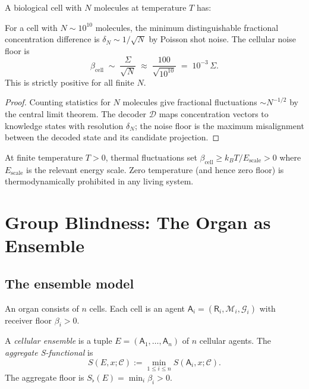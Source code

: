 \documentclass[twocolumn,11pt,a4paper]{article}
\newcommand{\Sfloor}{S_{\flat}}
\newcommand{\agent}{\mathsf{A}}
\newcommand{\receiver}{\mathsf{R}}
\newcommand{\Cell}{\mathcal{C}}
\begin{document}
A biological cell with $N$ molecules at temperature $T$ has:

\begin{proposition}\label{prop:cell-floor}
For a cell with $N \sim 10^{10}$ molecules, the minimum distinguishable
fractional concentration difference is $\delta_N \sim 1/\sqrt{N}$ by
Poisson shot noise. The cellular noise floor is
\[
\beta_{\mathrm{cell}} \;\sim\; \frac{\Sigma}{\sqrt{N}}
\;\approx\; \frac{100}{\sqrt{10^{10}}} \;=\; 10^{-3}\,\Sigma.
\]
This is strictly positive for all finite $N$.
\end{proposition}

\begin{proof}
Counting statistics for $N$ molecules give fractional fluctuations
$\sim N^{-1/2}$ by the central limit theorem. The decoder
$\mathcal{D}$ maps concentration vectors to knowledge states with
resolution $\delta_N$; the noise floor is the maximum misalignment
between the decoded state and its candidate projection.
\end{proof}

\begin{corollary}\label{cor:temp}
At finite temperature $T > 0$, thermal fluctuations set
$\beta_{\mathrm{cell}} \geq k_B T / E_{\mathrm{scale}} > 0$ where
$E_{\mathrm{scale}}$ is the relevant energy scale. Zero temperature
(and hence zero floor) is thermodynamically prohibited in any living
system.
\end{corollary}

\section{Group Blindness: The Organ as Ensemble}
\label{sec:group}

\subsection{The ensemble model}

An organ consists of $n$ cells. Each cell is an agent
$\agent_i = (\receiver_i, \mathcal{M}_i, \mathcal{G}_i)$ with receiver floor
$\beta_i > 0$.

\begin{definition}\label{def:ensemble}
A \emph{cellular ensemble} is a tuple $E = (\agent_1,\dots,\agent_n)$ of
$n$ cellular agents. The \emph{aggregate S-functional} is
\[
S(E, x; \Cell) := \min_{1 \leq i \leq n} S(\agent_i, x; \Cell).
\]
The aggregate floor is $\Sfloor(E) = \min_i \beta_i > 0$.
\end{definition}
\end{document}
